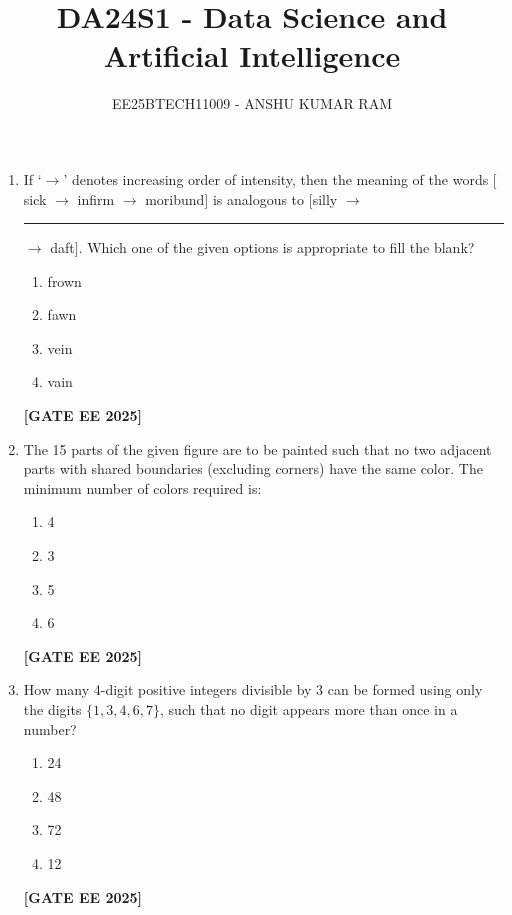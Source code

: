 \documentclass[journal]{IEEEtran}
\newcommand{\qfooter}{%
  \begin{flushright}\footnotesize\textbf{[GATE EE 2025]}\end{flushright}\vspace{1em}%
}
\begin{document}

\vspace{3cm}
\title{DA24S1 - Data Science and Artificial Intelligence}
\author{EE25BTECH11009 - ANSHU KUMAR RAM}
{\let\newpage\relax\maketitle}


\begin{enumerate}
\item If ‘$\rightarrow$’ denotes increasing order of intensity, then the meaning of the words $[$sick $\rightarrow$ infirm $\rightarrow$ moribund$]$ is analogous to $[$silly $\rightarrow$ \rule{6em}{0.05em} $\rightarrow$ daft$]$.
Which one of the given options is appropriate to fill the blank?
\begin{multicols}{2}
\begin{enumerate}
\item frown
\item fawn
\item vein
\item vain
\end{enumerate}
\qfooter
\end{multicols}

\item The 15 parts of the given figure are to be painted such that no two adjacent parts with shared boundaries (excluding corners) have the same color. The minimum number of colors required is:
\begin{multicols}{2}
\begin{enumerate}
\item 4
\item 3
\item 5
\item 6
\end{enumerate}
\qfooter
\end{multicols}

\item How many 4-digit positive integers divisible by 3 can be formed using only the digits $\{1,3,4,6,7\}$, such that no digit appears more than once in a number?
\begin{multicols}{2}
\begin{enumerate}
\item 24
\item 48
\item 72
\item 12
\end{enumerate}
\qfooter
\end{multicols}


\end{enumerate}
\end{document}

